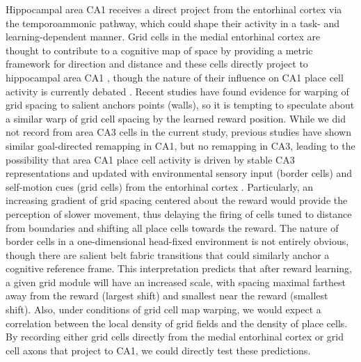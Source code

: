Hippocampal area CA1 receives a direct project from the entorhinal cortex via the temporoammonic pathway, which could shape their activity in a task- and learning-dependent manner. Grid cells in the medial entorhinal cortex are thought to contribute to a cognitive map of space by providing a metric framework for direction and distance \citep{Hafting2005}\citep{Jeffery2015a} and these cells directly project to hippocampal area CA1 \citep{Zhang2013}, though the nature of their influence on CA1 place cell activity is currently debated \citep{Wills2010}\citep{Langston2010}\citep{Koenig2011}\citep{Brandon2011a}. Recent studies \citep{Krupic2015a}\citep{Stensola2015a} have found evidence for warping of grid spacing to salient anchors points (walls), so it is tempting to speculate about a similar warp of grid cell spacing by the learned reward position.
While we did not record from area CA3 cells in the current study, previous studies \citep{Dupret2010a} have shown similar goal-directed remapping in CA1, but no remapping in CA3, leading to the possibility that area CA1 place cell activity is driven by stable CA3 representations and updated with environmental sensory input (border cells) and self-motion cues (grid cells) from the entorhinal cortex \citep{Bush2014a}.
Particularly, an increasing gradient of grid spacing centered about the reward would provide the perception of slower movement, thus delaying the firing of cells tuned to distance from boundaries and shifting all place cells towards the reward. The nature of border cells in a one-dimensional head-fixed environment is not entirely obvious, though there are salient belt fabric transitions that could similarly anchor a cognitive reference frame.
This interpretation predicts that after reward learning, a given grid module will have an increased scale, with spacing maximal farthest away from the reward (largest shift) and smallest near the reward (smallest shift).
Also, under conditions of grid cell map warping, we would expect a correlation between the local density of grid fields and the density of place cells.
By recording either grid cells directly from the medial entorhinal cortex or grid cell axons that project to CA1, we could directly test these predictions.


